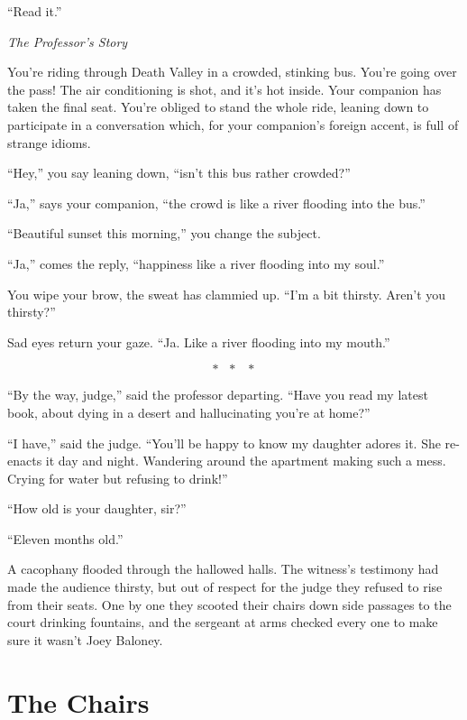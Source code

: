 \documentclass[oneside]{book}
\begin{document}
``Read it.''

\vspace{2mm}
\noindent \textit{The Professor's Story}
\vspace{2mm}

You're riding through Death Valley in a crowded, stinking bus.
You're going over the pass!
The air conditioning is shot, and it's hot inside.
Your companion has taken the final seat.
You're obliged to stand the whole ride, leaning down to participate in a conversation
which, for your companion's foreign accent, is full of strange idioms.

``Hey,'' you say leaning down, ``isn't this bus rather crowded?''

``Ja,'' says your companion, ``the crowd is like a river flooding into the bus.''

``Beautiful sunset this morning,'' you change the subject.

``Ja,'' comes the reply, ``happiness like a river flooding into my soul.''

You wipe your brow, the sweat has clammied up.
``I'm a bit thirsty.  Aren't you thirsty?''

Sad eyes return your gaze.
``Ja.  Like a river flooding into my mouth.''

\[*\mbox{ }*\mbox{ }*\]

``By the way, judge,'' said the professor departing.  ``Have you read my latest book, about dying in a desert
and hallucinating you're at home?''

``I have,'' said the judge.  ``You'll be happy to know my daughter adores it.
She re-enacts it day and night.  Wandering around the apartment making such a mess.
Crying for water but refusing to drink!''

``How old is your daughter, sir?''

``Eleven months old.''

\vspace{2mm}

A cacophany flooded through the hallowed halls.
The witness's testimony had made the audience thirsty,
but out of respect for the judge they refused to rise from their
seats.  One by one they scooted their chairs down side passages
to the court drinking fountains, and the sergeant at arms
checked every one to make sure it wasn't Joey Baloney.

\chapter{The Chairs}
\end{document}
